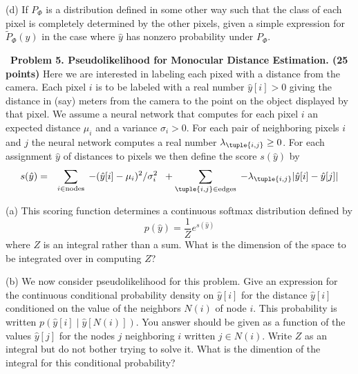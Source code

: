 \documentclass{article}
\newcommand{\solution}[1]{}
\begin{document}
\medskip
(d) If $P_\Phi$ is a distribution defined in some other way such that the class of each pixel is completely determined by the other pixels,
given a simple expression for $\tilde{P}_\Phi(\hat{y})$ in the case where $\hat{y}$ has nonzero probability under $P_\Phi$.

\solution{We have $P_\Phi(\hat{y}|\hat{y}\backslash i) = 1$ which implies $\tilde{P}(\hat{y}) = 1$.}

\bigskip
~{\bf Problem 5. Pseudolikelihood for Monocular Distance Estimation. (25 points)} Here we are interested in labeling each pixed with a distance from the camera.
Each pixel $i$ is to be labeled with a real number $\hat{y}[i] > 0$ giving the distance in (say) meters from the camera to the point on the object displayed by that pixel.  We assume a neural network
that computes for each pixel $i$ an expected distance $\mu_i$ and a variance $\sigma_i > 0$.  For each pair of neighboring pixels $i$ and $j$
the neural network computes a real number $\lambda_{\tuple{i,j}} \geq 0$. For each assignment $\hat{y}$ of distances to pixels we then define the score $s(\hat{y})$ by
\begin{eqnarray*}
  s(\hat{y}) & = & \sum_{i\in \mathrm{nodes}}\;- (\hat{y}[i] - \mu_i)^2/\sigma_i^2\;\; + \sum_{\tuple{i,j} \in \mathrm{edges}}\;- \lambda_{\tuple{i,j}}|\hat{y}[i]-\hat{y}[j]|
\end{eqnarray*}

\medskip
(a) This scoring function determines a continuous softmax distribution defined by
$$p(\hat{y}) = \frac{1}{Z}e^{s(\hat{y})}$$
where $Z$ is an integral rather than a sum.  What is the dimension of the space to be integrated over in computing $Z$?

\solution{
 This is an integration over $\mathbb{R}^N$ where $N$ is the number of nodes --- an $N_\mathrm{nodes}$ dimentional space.
}

\medskip
(b) We now consider pseudolikelihood for this problem. Give an expression for the continuous conditional probability density on $\hat{y}[i]$ for the distance $\hat{y}[i]$
conditioned on the value of the neighbors $N(i)$ of node $i$.  This probability is written $p(\hat{y}[i]\;|\;\hat{y}[N(i)])$.  You answer should be given as a function of the values
$\hat{y}[j]$ for the nodes $j$ neighboring $i$ written $j \in N(i)$.   Write $Z$ as an integral but do not bother trying to solve it.  What is the dimention of the integral for this
conditional probability?

\solution{
  \begin{eqnarray*}
    p(\hat{y}[i]\;|\;\hat{y}[N(i)]) & = & \frac{1}{Z} \exp\left(- (\hat{y}[i] - \mu_i)^2/\sigma_i^2 +  \sum_{j \in N(i)}\;- \lambda_{\tuple{i,j}}|\hat{y}[i]-\hat{y}[j]|\right) \\
    \\
    Z & = & \int_0^\infty  \exp\left(- (x - \mu_i)^2/\sigma_i^2 +  \sum_{j \in N(i)}\;- \lambda_{\tuple{i,j}}|x-\hat{y}[j]|\right) dx
  \end{eqnarray*}
  This is an integral over a one dimensional space (a single real number).
}
\end{document}
